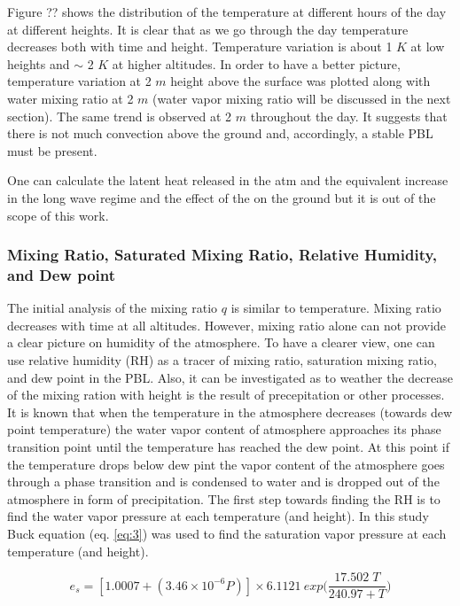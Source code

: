 \documentclass[a4paper,12pt]{article}
\numberwithin{equation}{section} %
\begin{document}
Figure ?? shows the distribution of the temperature at different hours of the day at different heights. It is clear that as we go through the day temperature decreases both with time and height. Temperature variation is about 1 $K$ at low heights and $\sim$ 2 $K$ at higher altitudes. In order to have a better picture, temperature variation at 2 $m$ height above the surface was plotted along with water mixing ratio at 2 $m$ (water vapor mixing ratio will be discussed in the next section). The same trend is observed at 2 $m$ throughout the day. It suggests that there is not much convection above the ground and, accordingly, a stable PBL must be present.

One can calculate the latent heat released in the atm and the equivalent increase in the long wave regime and the effect of the on the ground but it is out of the scope of this work.

\subsubsection{Mixing Ratio, Saturated Mixing Ratio, Relative Humidity, and Dew point}

The initial analysis of the mixing ratio $q$ is similar to temperature. Mixing ratio decreases with time at all altitudes. However, mixing ratio alone can not provide a clear picture on humidity of the atmosphere. To have a clearer view, one can use relative humidity (RH) as a tracer of mixing ratio, saturation mixing ratio, and dew point in the PBL. Also, it can be investigated as to weather the decrease of the mixing ration with height is the result of precepitation or other processes. It is known that when the temperature in the atmosphere decreases (towards dew point temperature) the water vapor content of atmosphere approaches its phase transition point until the temperature has reached the dew point. At this point if the temperature drops below dew pint the vapor content of the atmosphere goes through a phase transition and is condensed to water and is dropped out of the atmosphere in form of precipitation. The first step towards finding the RH is to find the water vapor pressure at each temperature (and height). In this study Buck equation (eq. \ref{eq:3}) was used to find the saturation vapor pressure at each temperature (and height). 

\vspace{0.25cm}
\begin{equation}\label{eq:3}
e_s = [1.0007 + (3.46 \times 10^{-6} P)] \times 6.1121 \: exp\Big(\frac{17.502\; T}{240.97 + T}\Big)
\end{equation}
\vspace{0.25cm}
\end{document}
